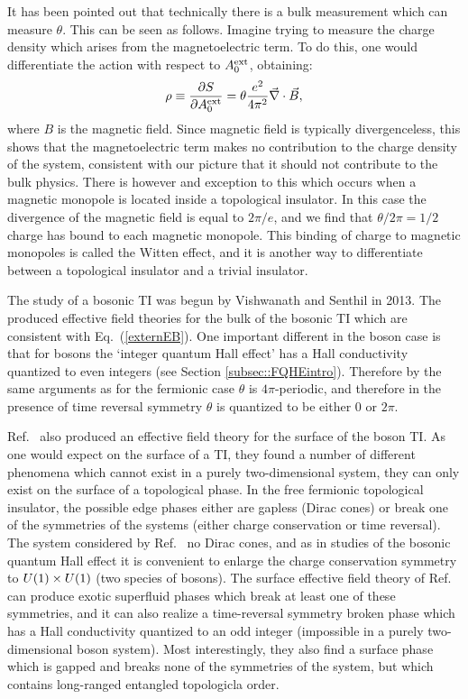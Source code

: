 It has been pointed out \cite{FranzWitten} that technically there is a bulk measurement which can measure $\theta$. This can be seen as follows. Imagine trying to measure the charge density which arises from the magnetoelectric term. To do this, one would differentiate the action with respect to $A^{\rm ext}_0$, obtaining:
\begin{equation}
\rho\equiv\frac{\partial S}{\partial A^{\rm ext}_0}=\theta\frac{e^2}{4\pi^2}\vec{\nabla}\cdot \vec{B},
\end{equation}
where $B$ is the magnetic field. Since magnetic field is typically divergenceless, this shows that the magnetoelectric term makes no contribution to the charge density of the system, consistent with our picture that it should not contribute to the bulk physics. There is however and exception to this which occurs when a magnetic monopole is located inside a topological insulator. In this case the divergence of the magnetic field is equal to $2\pi/e$, and we find that $\theta/2\pi=1/2$ charge has bound to each magnetic monopole. This binding of charge to magnetic monopoles is called the Witten effect, and it is another way to differentiate between a topological insulator and a trivial insulator. 

The study of a bosonic TI was begun by Vishwanath and Senthil in 2013\cite{SenthilVishwanath}. The produced effective field theories for the bulk of the bosonic TI which are consistent with Eq.~(\ref{externEB}). One important different in the boson case is that for bosons the `integer quantum Hall effect' has a Hall conductivity quantized to even integers (see Section \ref{subsec::FQHEintro}). Therefore by the same arguments as for the fermionic case $\theta$ is $4\pi$-periodic, and therefore in the presence of time reversal symmetry $\theta$ is quantized to be either $0$ or $2\pi$. 

Ref.~\cite{SenthilVishwanath} also produced an effective field theory for the surface of the boson TI. As one would expect on the surface of a TI, they found a number of different phenomena which cannot exist in a purely two-dimensional system, they can only exist on the surface of a topological phase. In the free fermionic topological insulator, the possible edge phases either are gapless (Dirac cones) or break one of the symmetries of the systems (either charge conservation or time reversal). The system considered by Ref.~\cite{SenthilVishwanath} no Dirac cones, and as in studies of the bosonic quantum Hall effect it is convenient to enlarge the charge conservation symmetry to $U(1)\times U(1)$ (two species of bosons). The surface effective field theory of Ref.~\cite{SenthilVishwanath} can produce exotic superfluid phases which break at least one of these symmetries, and it can also realize a time-reversal symmetry broken phase which has a Hall conductivity quantized to an odd integer (impossible in a purely two-dimensional boson system). Most interestingly, they also find a surface phase which is gapped and breaks none of the symmetries of the system, but which contains long-ranged entangled topologicla order.

